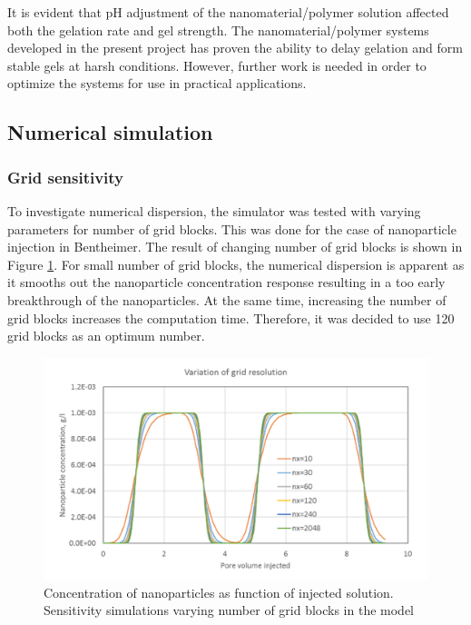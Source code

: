 \documentclass[energies,article,submit,moreauthors,pdftex]{Definitions/mdpi}
\begin{document}
It is evident that pH adjustment of the nanomaterial/polymer solution affected both the gelation rate and gel strength. The nanomaterial/polymer systems developed in the present project has proven the ability to delay gelation and form stable gels at harsh conditions. However, further work is needed in order to optimize the systems for use in practical applications. 

\subsection{Numerical simulation}
\subsubsection{Grid sensitivity}
To investigate numerical dispersion, the simulator was tested with varying parameters for number of grid blocks. This was done for the case of nanoparticle injection in Bentheimer. The result of changing number of grid blocks is shown in Figure \ref{cht:simNPa}. For small number of grid blocks, the numerical dispersion is apparent as it smooths out the nanoparticle concentration response resulting in a too early breakthrough of the nanoparticles. At the same time, increasing the number of grid blocks increases the computation time. Therefore, it was decided to use 120 grid blocks as an optimum number. 

\begin{figure}[h]
    \centering
    \includegraphics[width=.8\textwidth]{fig/simNPa.png}
    \caption{Concentration of nanoparticles as function of injected solution. Sensitivity simulations varying number of grid blocks in the model}
    \label{cht:simNPa}
\end{figure}
\end{document}
